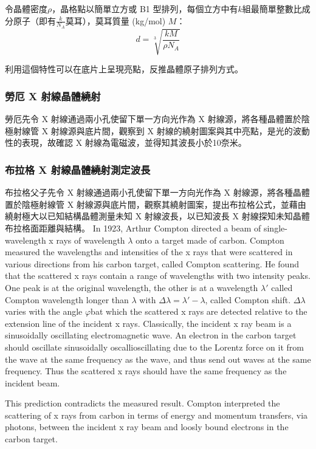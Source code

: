 \documentclass[a4paper,12pt]{article}
\begin{document}
令晶體密度$\rho$，晶格點以簡單立方或 B1 型排列，每個立方中有$k$組最簡單整數比成分原子（即有$\frac{k}{N_A}$莫耳），莫耳質量 (kg/mol) $M$：
\[d=\sqrt[3]{\frac{kM}{\rho N_A}}\]

利用這個特性可以在底片上呈現亮點，反推晶體原子排列方式。
\subsubsection{勞厄 X 射線晶體繞射}
勞厄先令 X 射線通過兩小孔使留下單一方向光作為 X 射線源，將各種晶體置於陰極射線管 X 射線源與底片間，觀察到 X 射線的繞射圖案與其中亮點，是光的波動性的表現，故確認 X 射線為電磁波，並得知其波長小於10奈米。
\subsubsection{布拉格 X 射線晶體繞射測定波長}
布拉格父子先令 X 射線通過兩小孔使留下單一方向光作為 X 射線源，將各種晶體置於陰極射線管 X 射線源與底片間，觀察其繞射圖案，提出布拉格公式，並藉由繞射極大以已知結構晶體測量未知 X 射線波長，以已知波長 X 射線探知未知晶體布拉格面距離與結構。
In 1923, Arthur Compton directed a beam of single-wavelength x rays of wavelength $\lambda$ onto a target made of carbon. Compton measured the wavelengths and intensities of the x rays that were scattered in various directions from his carbon target, called Compton scattering. He found that the scattered x rays contain a range of wavelengths with two intensity peaks. One peak is at the original wavelength, the other is at a wavelength $\lambda'$ called Compton wavelength longer than $\lambda$ with $\Delta\lambda=\lambda'-\lambda$, called Compton shift. $\Delta\lambda$ varies with the angle $\varphi$bat which the scattered x rays are detected relative to the extension line of the incident x rays.
Classically, the incident x ray beam is a sinusoidally oscillating electromagnetic wave. An electron in the carbon target should oscillate sinusoidally oscallioscillating due to the Lorentz force on it from the wave at the same frequency as the wave, and thus send out waves at the same frequency. Thus the scattered x rays should have the same frequency as the incident beam.

This prediction contradicts the measured result.
Compton interpreted the scattering of x rays from carbon in terms of energy and momentum transfers, via photons, between the incident x ray beam and loosly bound electrons in the carbon target.
\end{document}
